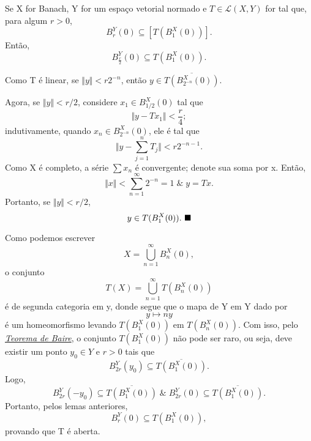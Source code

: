 \documentclass[../functional_analysis.tex]{subfiles}
\begin{document}
\begin{lemma*}
	Se X for Banach, Y for um espaço vetorial normado e \(T\in \mathcal{L}(X, Y)\) for tal que, para algum \(r> 0\),
	\[
		B_{r}^{Y}(0)\subseteq [T(B_{1}^{X}(0))].
	\]
	Então,
	\[
		B_{\frac{r}{2}}^{Y}(0)\subseteq T(B_{1}^{X}(0)).
	\]
\end{lemma*}
\begin{proof*}
	Como T é linear, se \(\Vert y \Vert < r2^{-n}\), então \(y\in \overline{T(B_{2^{-n}}^{X}(0))}.\)

	Agora, se \(\Vert y \Vert < r/2\), considere \(x_1\in B_{1/2}^{X}(0)\) tal que
	\[
		\Vert y-Tx_1 \Vert < \frac{r}{4};
	\]
	indutivamente, quando \(x_{n}\in B_{2^{-n}}^{X}(0)\), ele é tal que
	\[
		\biggl\Vert y- \sum\limits_{j=1}^{n}T_{j} \biggr\Vert < r2^{-n-1}.
	\]
	Como X é completo, a série \(\sum x_{n}\) é convergente; denote sua soma por x. Então,
	\[
		\Vert x \Vert < \sum\limits_{n=1}^{\infty}2^{-n}=1\;\&\; y = Tx.
	\]
	Portanto, se \(\Vert y \Vert < r/2\),
	\[
		y\in T(B_{1}^{X}(0)).\text{ $\blacksquare$}
	\]

\end{proof*}
\begin{proof*}
	Como podemos escrever
	\[
		X = \bigcup_{n=1}^{\infty}B_{n}^{X}(0),
	\]
	o conjunto
	\[
		T(X) = \bigcup_{n=1}^{\infty}T(B_{n}^{X}(0))
	\]
	é de segunda categoria em y, donde segue que o mapa de Y em Y dado por
	\[
		y\mapsto ny
	\]
	é um homeomorfismo levando \(T(B_{1}^{X}(0))\) em \(T(B_{n}^{X}(0))\). Com isso, pelo \hyperlink{baire_theorem}{\textit{Teorema de Baire}}, o conjunto
	\(T(B_{1}^{X}(0))\) não pode ser raro, ou seja, deve existir um ponto \(y_{0}\in Y\) e \(r > 0\) tais que
	\[
		B_{2r}^{Y}(y_{0})\subseteq \overline{T(B_{1}^{X}(0))}.
	\]
	Logo,
	\[
		B_{2r}^{Y}(-y_{0})\subseteq \overline{T(B_{1}^{X}(0))}\;\&\; B_{2r}^{Y}(0)\subseteq \overline{T(B_{1}^{X}(0))}.
	\]
	Portanto, pelos lemas anteriores,
	\[
		B_{r}^{Y}(0)\subseteq T(B_{1}^{X}(0)),
	\]
	provando que T é aberta. \qedsymbol
\end{proof*}
\end{document}
